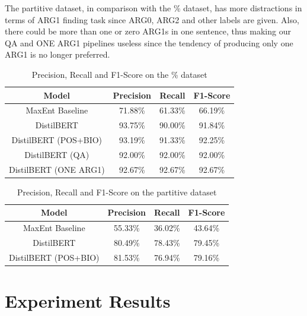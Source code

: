 \documentclass[11pt]{article}
\begin{document}
The partitive dataset, in comparison with the \% dataset, has more distractions in terms of ARG1 finding task since ARG0, ARG2 and other labels are given. Also, there could be more than one or zero ARG1s in one sentence, thus making our QA and ONE ARG1 pipelines useless since the tendency of producing only one ARG1 is no longer preferred.


\begin{table}
  \centering
  \begin{tabular}{c||c|c|c}
    \hline
    \textbf{Model}        & \textbf{Precision} & \textbf{Recall} & \textbf{F1-Score} \\
    \hline
    MaxEnt Baseline       & {71.88\%}          & {61.33\%}       & {66.19\%}         \\
    DistilBERT            & {93.75\%}          & {90.00\%}       & {91.84\%}         \\
    DistilBERT (POS+BIO)  & {93.19\%}          & {91.33\%}       & {92.25\%}         \\
    DistilBERT (QA)       & {92.00\%}          & {92.00\%}       & {92.00\%}         \\
    DistilBERT (ONE ARG1) & {92.67\%}          & {92.67\%}       & {92.67\%}         \\
    \hline
  \end{tabular}
  \caption{Precision, Recall and F1-Score on the \% dataset}
  \label{tab:results-on-first-dataset}
\end{table}

\begin{table}[t]
  \centering
  \begin{tabular}{c||c|c|c}
    \hline
    \textbf{Model}       & \textbf{Precision} & \textbf{Recall} & \textbf{F1-Score} \\
    \hline
    MaxEnt Baseline      & {55.33\%}          & {36.02\%}       & {43.64\%}         \\
    DistilBERT           & {80.49\%}          & {78.43\%}       & {79.45\%}         \\
    DistilBERT (POS+BIO) & {81.53\%}          & {76.94\%}       & {79.16\%}         \\
    \hline
  \end{tabular}
  \caption{Precision, Recall and F1-Score on the partitive dataset}
  \label{tab:results-on-partitive-dataset}
\end{table}

\section{Experiment Results}
\end{document}
